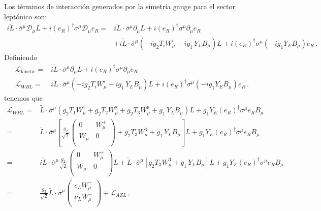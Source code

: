 \begin{frame}
Los términos de interacción generados por la simetría gauge para el sector leptónico son:
\begin{align}
\label{eq:devLW}
  i \widetilde{L}\cdot\overline{\sigma}^\mu\mathcal{D}_\mu L+  i \left( e_R \right)^{\dagger}{\sigma}^\mu\mathcal{D}_\mu e_R
=&i \widetilde{L}\cdot\overline{\sigma}^\mu\partial_\mu L+i \left(e_R  \right)^{\dagger}\sigma^\mu\partial_\mu {e_R} \nonumber\\
&+ i \widetilde{L}\cdot\overline{\sigma}^\mu(-i g_2 T_iW_\mu^i-i {g_1}\,Y_LB_\mu) L + i \left( e_R \right)^{\dagger}\sigma^\mu \left( -i{g_1} Y_E B_{\mu} \right) {e_R}\,.
\end{align}
Definiendo
\begin{align}
\label{eq:knt}
  \mathcal{L}_{\text{kinetic}}=&i \widetilde{L}\cdot\overline{\sigma}^\mu\partial_\mu L+i \left(e_R  \right)^{\dagger}\sigma^\mu\partial_\mu {e_R} \\
  \mathcal{L}_{WBL}=&i \widetilde{L}\cdot\overline{\sigma}^\mu(-i g_2 T_iW_\mu^i-i {g_1}\,Y_LB_\mu) L + i \left( e_R \right)^{\dagger}\sigma^\mu \left( -i{g_1} Y_E B_{\mu} \right) {e_R}\nonumber\,.
\end{align}
tenemos que
\begin{align}
\mathcal{L}_{WBL}=& \widetilde{L}\cdot\overline{\sigma}^\mu(g_2 T_1W_\mu^1+ g_2 T_2W_\mu^2+g_2 T_3W_\mu^3+{g_1}\,Y_LB_\mu) L+ g_1 Y_E\left(e_R \right)^{\dagger}\sigma^\mu  {e_R} B_\mu\nonumber\\
=& \widetilde{L}\cdot\overline{\sigma}^\mu\left[\frac{g_2}{\sqrt{2}}
  \begin{pmatrix}
0 & W_\mu^+\\
W_\mu^- & 0\\    
  \end{pmatrix}
+g_2 T_3W_\mu^3+{g_1}\,Y_LB_\mu
\right]L+ {g_1} Y_E\left(e_R \right)^{\dagger}\sigma^\mu  {e_R} B_\mu\nonumber\\
=&i \widetilde{L}\cdot\overline{\sigma}^\mu\frac{g_2}{\sqrt{2}}
  \begin{pmatrix}
0 & W_\mu^+\\
W_\mu^- & 0\\    
  \end{pmatrix}L+
 \widetilde{L}\cdot\overline{\sigma}^\mu\left[g_2 T_3W_\mu^3+{g_1}\,Y_LB_\mu
\right]L+ {g_1} Y_E\left(e_R \right)^{\dagger}\sigma^\mu  {e_R} B_\mu\nonumber\\
  =& \frac{g_2}{\sqrt{2}}\widetilde{L}\cdot\overline{\sigma}^\mu
  \begin{pmatrix}
e_LW_\mu^+\\
\nu_L W_\mu^-\\    
  \end{pmatrix}+\mathcal{L}_{A Z L}\,,
\end{align}


\end{frame}
